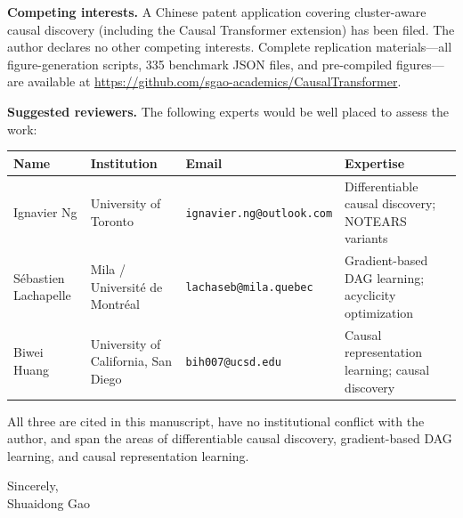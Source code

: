 \documentclass[12pt,a4paper]{article}
\begin{document}
\vspace{0.3cm}

\textbf{Competing interests.} A Chinese patent application covering cluster-aware causal discovery (including the Causal Transformer extension) has been filed. The author declares no other competing interests. Complete replication materials---all figure-generation scripts, 335 benchmark JSON files, and pre-compiled figures---are available at \url{https://github.com/sgao-academics/CausalTransformer}.

\vspace{0.3cm}

\textbf{Suggested reviewers.} The following experts would be well placed to assess the work:

\vspace{0.5em}

\begin{tabular}{@{}p{3.5cm}p{3.5cm}p{3.6cm}p{3.6cm}@{}}
\toprule
\textbf{Name} & \textbf{Institution} & \textbf{Email} & \textbf{Expertise} \\
\midrule
Ignavier Ng
  & University of Toronto
  & \texttt{ignavier.ng@outlook.com}
  & Differentiable causal discovery; NOTEARS variants \\[6pt]
S\'ebastien Lachapelle
  & Mila / Universit\'e de Montr\'eal
  & \texttt{lachaseb@mila.quebec}
  & Gradient-based DAG learning; acyclicity optimization \\[6pt]
Biwei Huang
  & University of California, San Diego
  & \texttt{bih007@ucsd.edu}
  & Causal representation learning; causal discovery \\
\bottomrule
\end{tabular}

\vspace{1em}
\noindent All three are cited in this manuscript, have no institutional conflict with the author, and span the areas of differentiable causal discovery, gradient-based DAG learning, and causal representation learning.

\vspace{1cm}

\noindent Sincerely,\\
\vspace{0.3cm}
\noindent Shuaidong Gao
\end{document}
